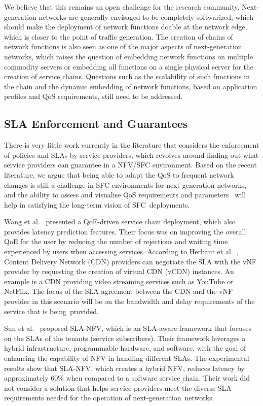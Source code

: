 \documentclass[futureinternet,review,accept,pdftex,moreauthors]{Definitions/mdpi}
\begin{document}
We believe that this remains an open challenge for the research community. Next-generation networks are generally envisaged to be completely softwarized, which should make the deployment of network functions doable at the network edge, which is closer to the point of traffic generation. The creation of chains of network functions is also seen as one of the major aspects of next-generation networks, which raises the question of embedding network functions on multiple commodity servers or embedding all functions on a single physical server for the creation of service chains. Questions such as the scalability of such functions in the chain and the dynamic embedding of network functions, based on application profiles and QoS requirements, still need to be addressed.



\subsection{SLA Enforcement and Guarantees}
\label{SLA enforcement and guarantees}
There is very little work currently in the literature that considers the enforcement of policies and SLAs by service providers, which revolves around finding out what service providers can guarantee in a NFV/SFC environment. Based on the recent literature, we argue that being able to adapt the QoS to frequent network changes is still a challenge in SFC environments for next-generation networks, and the ability to assess and visualise QoS requirements and parameters~\cite{zhao2021security} will help in satisfying the long-term vision of SFC~deployments. 

Wang {et al.}~\cite{wang2018improving} presented a QoE-driven service chain deployment, which also provides latency prediction features. Their focus was on improving the overall QoE for the user by reducing the number of rejections and waiting time experienced by users when accessing services. According to Herbaut {et al.}~\cite{herbaut2016deploying}, Content Delivery Network (CDN) providers can negotiate the SLA with the vNF provider by requesting the creation of virtual CDN (vCDN) instances. An example is a CDN providing video streaming services such as YouTube or NetFlix. The focus of the SLA agreement between the CDN and the vNF provider in this scenario will be on the bandwidth and delay requirements of the service that is being~provided. 

Sun {et al.}~\cite{sun2016sla} proposed SLA-NFV, which is an SLA-aware framework  that focuses on the SLAs of the tenants (service subscribers). Their framework leverages a hybrid infrastructure, programmable hardware, and software, with the goal of enhancing the capability of NFV in handling different SLAs. The experimental results show that SLA-NFV, which creates a hybrid NFV, reduces latency by approximately 60\% when compared to a software service chain. Their work did not consider a solution that helps service providers  meet the diverse SLA requirements needed for the operation of next-generation~networks. 
\end{document}
